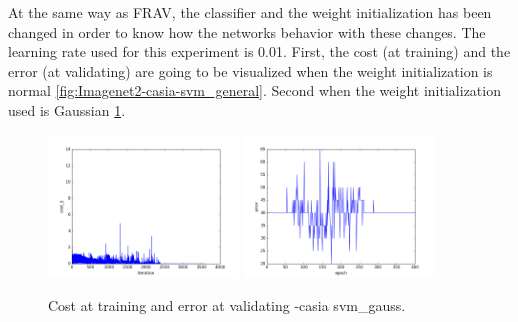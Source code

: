 \clearpage
At the same way as FRAV, the classifier and the weight initialization has been changed in order to know how the networks behavior with these changes. The learning rate used for this experiment is 0.01. First, the cost (at training) and the error (at validating) are going to be visualized when the weight initialization is normal \ref{fig:Imagenet2-casia-svm_general}. Second when the weight initialization used is Gaussian \ref{fig:Imagenet2-casia-svm_gauss}.\\


\begin{figure}[htb]
\centering
\includegraphics[width=0.45\textwidth]{images/FRAv_casia_ImageNet/Imagenet2/casia/svm_gauss/cost.png}
\includegraphics[width=0.45\textwidth]{images/FRAv_casia_ImageNet/Imagenet2/casia/svm_gauss/error.png}
\caption{Cost at training and error at validating -casia svm\_gauss.} \label{fig:Imagenet2-casia-svm_gauss}
\end{figure}

